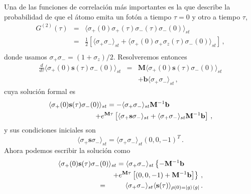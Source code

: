 \documentclass[twocolumn,aps,eqsecnum]{revtex4}
\begin{document}
Una de las funciones de correlaci\'on m\'as importantes es la que describe 
la probabilidad de que el \'atomo emita un fot\'on a tiempo $\tau=0$ y otro 
a tiempo $\tau$,  
%
\begin{eqnarray}
G^{(2)}  (\tau) &=& \langle \sigma_+(0) \sigma_+ (\tau) \sigma_- (\tau)  
	\sigma_-(0) \rangle_{st}  	\\
 &=& \frac{1}{2} \left[ \langle \sigma_+ \sigma_- \rangle_{st} 
 	+ \langle \sigma_+(0) \sigma_+ \sigma_z (\tau)  \sigma_-(0) \rangle_{st}
 	\right] \,, 	\label{eq:G2_tau} \nonumber \\
 \end{eqnarray}
donde usamos $\sigma_+ \sigma_- = (1+\sigma_z)/2$. Resolveremos 
entonces 
%
\begin{eqnarray}
\frac{d}{d \tau} \langle \sigma_{+}(0) \mathbf{s} (\tau) 
	\sigma_{-}(0) \rangle_{st}  	
 &=& \mathbf{M} \langle \sigma_{+}(0) \mathbf{s} (\tau) 
 	\sigma_{-}(0) \rangle_{st}  		\nonumber 	\\ 
	&& +\mathbf{b} \langle \sigma_{+} \sigma_{-} \rangle_{st} 	\,,  
\end{eqnarray}
cuya soluci\'on formal es 
%
\begin{eqnarray}
\lefteqn{  \langle \sigma_{+}(0) \mathbf{s} (\tau) \sigma_{-}(0) \rangle_{st}  
	= -\langle \sigma_+ \sigma_- \rangle_{st} \mathbf{M}^{-1} \mathbf{b} } 
	\hspace{20mm}	 	\nonumber \\
&& +e^{ \mathbf{M} \tau } \left[ \langle \sigma_+ \mathbf{s} \sigma_- \rangle_{st} 
	 +\langle \sigma_+ \sigma_- \rangle_{st} \mathbf{M}^{-1} \mathbf{b} \right] \,, 
	 \nonumber \\
\end{eqnarray}
y sus condiciones iniciales son
%
\begin{equation}
\langle \sigma_+ \mathbf{s} \sigma_- \rangle_{st} 
	= \langle \sigma_+ \sigma_- \rangle_{st} (0,0,-1)^T \,.
\end{equation}
Ahora podemos escribir la soluci\'on como
%
\begin{eqnarray}
\lefteqn{  \langle \sigma_{+}(0) \mathbf{s} (\tau) \sigma_{-}(0) \rangle_{st}  
	= \langle \sigma_+ \sigma_- \rangle_{st} 
	\left\{ - \mathbf{M}^{-1} \mathbf{b} \right. 	} 
	\hspace{20mm}	 	\nonumber \\
&& \left. +e^{ \mathbf{M} \tau } \left[ (0,0,-1) 
	 + \mathbf{M}^{-1} \mathbf{b} \right] 	\right\} \,, 	\nonumber \\ 
%
&=& \langle \sigma_+ \sigma_- \rangle_{st} 
	\langle \mathbf{s} (\tau) \rangle_{\rho(0)= |g \rangle \langle g| } \,.
\end{eqnarray}
\end{document}
